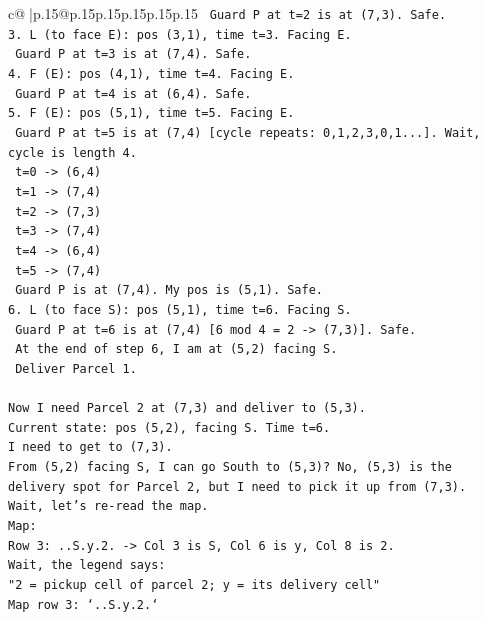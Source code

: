 \documentclass{article}
\begin{document}
{\begin{supertabular}{c@{$\;$}|p{.15\linewidth}@{}p{.15\linewidth}p{.15\linewidth}p{.15\linewidth}p{.15\linewidth}p{.15\linewidth}}
{{{\texttt{   Guard P at t=2 is at (7,3). Safe.} \\
\texttt{3. L (to face E): pos (3,1), time t=3. Facing E.} \\
\texttt{   Guard P at t=3 is at (7,4). Safe.} \\
\texttt{4. F (E): pos (4,1), time t=4. Facing E.} \\
\texttt{   Guard P at t=4 is at (6,4). Safe.} \\
\texttt{5. F (E): pos (5,1), time t=5. Facing E.} \\
\texttt{   Guard P at t=5 is at (7,4) {[}cycle repeats: 0,1,2,3,0,1...{]}. Wait, cycle is length 4.} \\
\texttt{   t=0 {-}> (6,4)} \\
\texttt{   t=1 {-}> (7,4)} \\
\texttt{   t=2 {-}> (7,3)} \\
\texttt{   t=3 {-}> (7,4)} \\
\texttt{   t=4 {-}> (6,4)} \\
\texttt{   t=5 {-}> (7,4)} \\
\texttt{   Guard P is at (7,4). My pos is (5,1). Safe.} \\
\texttt{6. L (to face S): pos (5,1), time t=6. Facing S.} \\
\texttt{   Guard P at t=6 is at (7,4) {[}6 mod 4 = 2 {-}> (7,3){]}. Safe.} \\
\texttt{   At the end of step 6, I am at (5,2) facing S.} \\
\texttt{   Deliver Parcel 1.} \\
\\ 
\texttt{Now I need Parcel 2 at (7,3) and deliver to (5,3).} \\
\texttt{Current state: pos (5,2), facing S. Time t=6.} \\
\texttt{I need to get to (7,3).} \\
\texttt{From (5,2) facing S, I can go South to (5,3)? No, (5,3) is the delivery spot for Parcel 2, but I need to pick it up from (7,3).} \\
\texttt{Wait, let's re{-}read the map.} \\
\texttt{Map:} \\
\texttt{Row 3: ..S.y.2. {-}> Col 3 is S, Col 6 is y, Col 8 is 2.} \\
\texttt{Wait, the legend says:} \\
\texttt{"2 = pickup cell of parcel 2; y = its delivery cell"} \\
\texttt{Map row 3: `..S.y.2.`} \\
}}}
\end{supertabular}}
\end{document}
